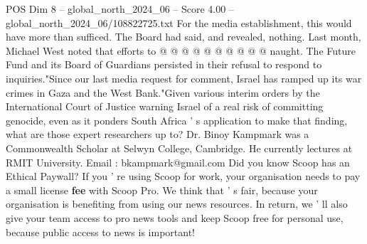 \begin{textsample}{POS Dim 8 – global\_north\_2024\_06 – Score 4.00 – global\_north\_2024\_06/108822725.txt}
For the media establishment, this would have more than sufficed.
The Board had said, and revealed, nothing.
Last month, Michael West noted that efforts to @ @ @ @ @ @ @ @ @ @ naught.
The Future Fund and its Board of Guardians persisted in their refusal to respond to inquiries."Since our last media request for comment, Israel has ramped up its war crimes in Gaza and the West Bank."Given various interim orders by the International Court of Justice warning Israel of a real risk of committing genocide, even as it ponders South Africa ' s application to make that finding, what are those expert researchers up to?
Dr.
Binoy Kampmark was a Commonwealth Scholar at Selwyn College, Cambridge.
He currently lectures at RMIT University.
Email : bkampmark@gmail.com Did you know Scoop has an Ethical Paywall?
If you ' re using Scoop for work, your organisation needs to pay a small license \textbf{fee} with Scoop Pro.
We think that ' s fair, because your organisation is benefiting from using our news resources.
In return, we ' ll also give your team access to pro news tools and keep Scoop free for personal use, because public access to news is important!

\end{textsample}
